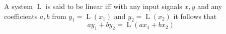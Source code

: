 A system $\operatorname{L}$ is said to be linear iff with any input signals $x,y$ and any coefficients $a,b$ from $y_1 = \operatorname{L}(x_1)$ and $y_2 = \operatorname{L}(x_2)$ it follows that
$$a y_1 + b y_2 = \operatorname{L}(a x_1 + b x_2)$$
